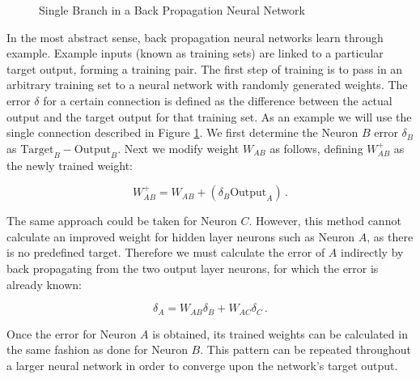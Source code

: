 \begin{figure}[ht]
	\centering
	
	\caption{Single Branch in a Back Propagation Neural Network}
	\label{fig:backprop}
\end{figure}

In the most abstract sense, back propagation neural networks learn through example.  Example inputs (known as training sets) are linked to a particular target output, forming a training pair.  The first step of training is to pass in an arbitrary training set to a neural network with randomly generated weights.  The error $\delta$ for a certain connection is defined as the difference between the actual output and the target output for that training set. As an example we will use the single connection described in Figure \ref{fig:backprop}.  We first determine the Neuron $B$ error $\delta_B$ as $\text{Target}_B - \text{Output}_B$.   Next we modify weight $W_{AB}$ as follows, defining $W_{AB}^{+}$ as the newly trained weight:

\begin{equation}
	W_{AB}^{+} = W_{AB} + (\delta_B \text{Output}_A)\,.
\end{equation}

The same approach could be taken for Neuron $C$.  However, this method cannot calculate an improved weight for hidden layer neurons such as Neuron $A$, as there is no predefined target.  Therefore we must calculate the error of $A$ indirectly by back propagating from the two output layer neurons, for which the error is already known:

\begin{equation}
	\delta_A = W_{AB}\delta_B + W_{AC}\delta_C \,.
\end{equation}

Once the error for Neuron $A$ is obtained, its trained weights can be calculated in the same fashion as done for Neuron $B$.  This pattern can be repeated throughout a larger neural network in order to converge upon the network's target output.
